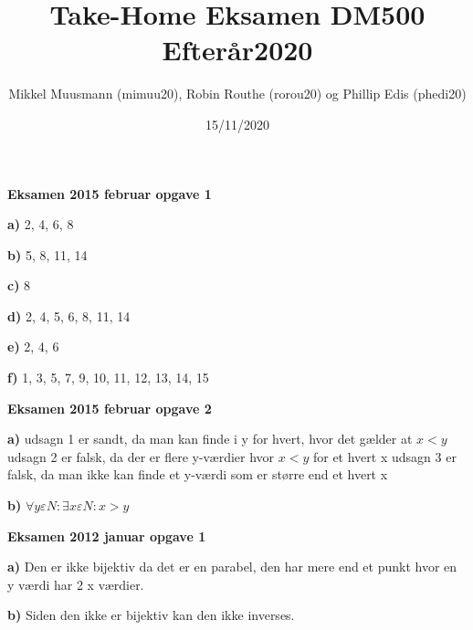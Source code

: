 \documentclass{article}
\title{\textbf{Take-Home Eksamen DM500 Efterår2020}}
\author{Mikkel Muusmann (mimuu20), Robin Routhe (rorou20) og Phillip Edis (phedi20)}
\date{15/11/2020}
\begin{document}
\maketitle

\textbf{Eksamen 2015 februar opgave 1}

\textbf{a)}
	2, 4, 6, 8

\vspace{5mm} %

\textbf{b)}
	5, 8, 11, 14

\vspace{5mm} %

\textbf{c)}
	8

\vspace{5mm} %

\textbf{d)}
	2, 4, 5, 6, 8, 11, 14

\vspace{5mm} %

\textbf{e)}
	2, 4, 6

\vspace{5mm} %

\textbf{f)}
	1, 3, 5, 7, 9, 10, 11, 12, 13, 14, 15

\vspace{5mm} %
	
\textbf{Eksamen 2015 februar opgave 2}

\textbf{a)}
	udsagn 1 er sandt, da man kan finde i y for hvert, hvor det gælder at $x<y$
	udsagn 2 er falsk, da der er flere y-værdier hvor $x<y$ for et hvert x
	udsagn 3 er falsk, da man ikke kan finde et y-værdi som er større end et hvert x

\vspace{5mm} %

\textbf{b)}
	$\forall y \varepsilon N: \exists x \varepsilon N: x > y$

\vspace{5mm} %

\textbf{Eksamen 2012 januar opgave 1}

\textbf{a)}
Den er ikke bijektiv da det er en parabel, den har mere end et punkt
hvor en y værdi har 2 x værdier. 

\vspace{5mm} %

\textbf{b)}
Siden den ikke er bijektiv kan den ikke inverses.

\vspace{5mm} %
\end{document}
